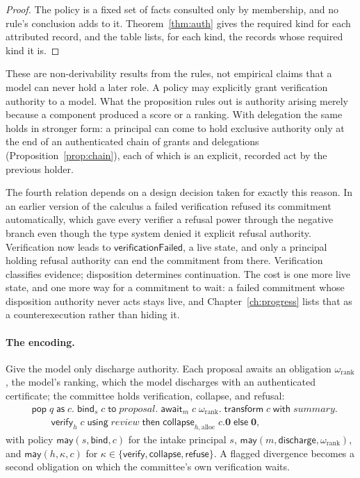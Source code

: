 \documentclass[11pt,openany]{book}
\theoremstyle{remark}
\begin{document}
\begin{proof}
The policy is a fixed set of facts consulted only by membership, and no
rule's conclusion adds to it. Theorem~\ref{thm:auth} gives the required
kind for each attributed record, and the table lists, for each kind, the
records whose required kind it is.
\end{proof}

These are non-derivability results from the rules, not empirical claims
that a model can never hold a later role. A policy may explicitly grant
verification authority to a model. What the proposition rules out is
authority arising merely because a component produced a score or a
ranking. With delegation the same holds in stronger form: a principal can
come to hold exclusive authority only at the end of an authenticated chain
of grants and delegations (Proposition~\ref{prop:chain}), each of which is
an explicit, recorded act by the previous holder.

The fourth relation depends on a design decision taken for exactly this
reason. In an earlier version of the calculus a failed verification
refused its commitment automatically, which gave every verifier a refusal
power through the negative branch even though the type system denied it
explicit refusal authority. Verification now leads to
$\mathsf{verificationFailed}$, a live state, and only a principal holding
refusal authority can end the commitment from there. Verification
classifies evidence; disposition determines continuation. The cost is one
more live state, and one more way for a commitment to wait: a failed
commitment whose disposition authority never acts stays live, and
Chapter~\ref{ch:progress} lists that as a counterexecution rather than
hiding it.

\paragraph{The encoding.} Give the model only discharge authority. Each
proposal awaits an obligation $\omega_{\mathrm{rank}}$, the model's
ranking, which the model discharges with an authenticated certificate;
the committee holds verification, collapse, and refusal:
\[
\begin{aligned}
&\mathsf{pop}\;q\;\mathsf{as}\;c.\;
\mathsf{bind}_s\;c\;\mathsf{to}\;\mathit{proposal}.\;
\mathsf{await}_m\;c\;\omega_{\mathrm{rank}}.\;
\mathsf{transform}\;c\;\mathsf{with}\;\mathit{summary}.\\
&\qquad\mathsf{verify}_h\;c\;\mathsf{using}\;\mathit{review}\;
\mathsf{then}\;\mathsf{collapse}_{h,\mathrm{alloc}}\;c.\mathbf 0\;
\mathsf{else}\;\mathbf 0,
\end{aligned}
\]
with policy $\mathsf{may}(s,\mathsf{bind},c)$ for the intake principal
$s$, $\mathsf{may}(m,\mathsf{discharge},\omega_{\mathrm{rank}})$, and
$\mathsf{may}(h,\kappa,c)$ for $\kappa\in\{\mathsf{verify},
\mathsf{collapse},\mathsf{refuse}\}$. A flagged divergence becomes a second
obligation on which the committee's own verification waits.
\end{document}
